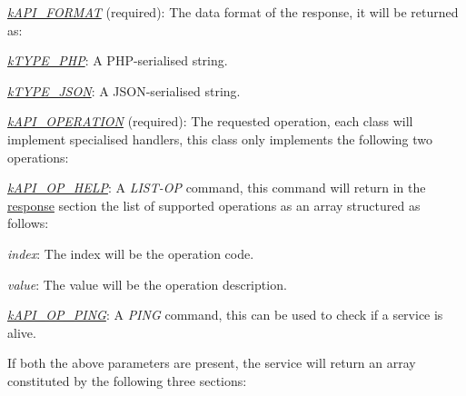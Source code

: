 \begin{DoxyItemize}
\item {\itshape \hyperlink{}{k\-A\-P\-I\-\_\-\-F\-O\-R\-M\-A\-T}} (required)\-: The data format of the response, it will be returned as\-: 
\begin{DoxyItemize}
\item {\itshape \hyperlink{}{k\-T\-Y\-P\-E\-\_\-\-P\-H\-P}}\-: A P\-H\-P-\/serialised string. 
\item {\itshape \hyperlink{}{k\-T\-Y\-P\-E\-\_\-\-J\-S\-O\-N}}\-: A J\-S\-O\-N-\/serialised string. 
\end{DoxyItemize}
\item {\itshape \hyperlink{}{k\-A\-P\-I\-\_\-\-O\-P\-E\-R\-A\-T\-I\-O\-N}} (required)\-: The requested operation, each class will implement specialised handlers, this class only implements the following two operations\-: 
\begin{DoxyItemize}
\item {\itshape \hyperlink{}{k\-A\-P\-I\-\_\-\-O\-P\-\_\-\-H\-E\-L\-P}}\-: A {\itshape L\-I\-S\-T-\/\-O\-P} command, this command will return in the \hyperlink{}{response} section the list of supported operations as an array structured as follows\-: 
\begin{DoxyItemize}
\item {\itshape index}\-: The index will be the operation code. 
\item {\itshape value}\-: The value will be the operation description. 
\end{DoxyItemize}
\item {\itshape \hyperlink{}{k\-A\-P\-I\-\_\-\-O\-P\-\_\-\-P\-I\-N\-G}}\-: A {\itshape P\-I\-N\-G} command, this can be used to check if a service is alive. 
\end{DoxyItemize}
\end{DoxyItemize}

If both the above parameters are present, the service will return an array constituted by the following three sections\-:



